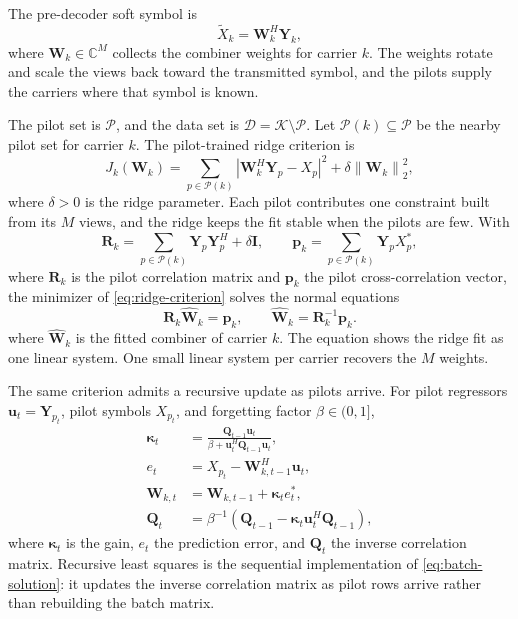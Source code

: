 \documentclass[conference]{IEEEtran}
\newcommand{\C}{\mathbb{C}}
\newcommand{\Kset}{\mathcal{K}}
\newcommand{\Pset}{\mathcal{P}}
\newcommand{\Dset}{\mathcal{D}}
\begin{document}
The pre-decoder soft symbol is
\begin{equation}
  \widetilde X_k=\mathbf W_k^{H}\mathbf Y_k,
  \label{eq:combiner}
\end{equation}
where \(\mathbf W_k\in\C^M\) collects the combiner weights for carrier
\(k\).
The weights rotate and scale the views back toward the transmitted symbol,
and the pilots supply the carriers where that symbol is known.

The pilot set is \(\Pset\), and the data set is
\(\Dset=\Kset\setminus\Pset\).  Let \(\Pset(k)\subseteq\Pset\) be the
nearby pilot set for carrier \(k\).  The pilot-trained ridge criterion is
\begin{equation}
  J_k(\mathbf W_k)
  =
  \sum_{p\in\Pset(k)}
  \left|\mathbf W_k^{H}\mathbf Y_p-X_p\right|^2
  +\delta\left\lVert\mathbf W_k\right\rVert_2^2,
  \label{eq:ridge-criterion}
\end{equation}
where \(\delta>0\) is the ridge parameter.  Each pilot contributes one
constraint built from its \(M\) views, and the ridge keeps the fit stable
when the pilots are few.  With
\begin{equation}
  \mathbf R_k=\sum_{p\in\Pset(k)}\mathbf Y_p\mathbf Y_p^{H}+\delta\mathbf I,
  \qquad
  \mathbf p_k=\sum_{p\in\Pset(k)}\mathbf Y_pX_p^{*},
  \label{eq:pilot-correlations}
\end{equation}
where \(\mathbf R_k\) is the pilot correlation matrix and
\(\mathbf p_k\) the pilot cross-correlation vector, the minimizer of
\eqref{eq:ridge-criterion} solves the normal equations
\begin{equation}
  \mathbf R_k\widehat{\mathbf W}_k=\mathbf p_k,
  \qquad
  \widehat{\mathbf W}_k=\mathbf R_k^{-1}\mathbf p_k.
  \label{eq:batch-solution}
\end{equation}
where \(\widehat{\mathbf W}_k\) is the fitted combiner of carrier \(k\).
The equation shows the ridge fit as one linear system.
One small linear system per carrier recovers the \(M\) weights.

The same criterion admits a recursive update as pilots arrive.  For pilot
regressors \(\mathbf u_t=\mathbf Y_{p_t}\), pilot symbols
\(X_{p_t}\), and forgetting factor \(\beta\in(0,1]\),
\begin{align}
  \boldsymbol\kappa_t
  &=
  \frac{\mathbf Q_{t-1}\mathbf u_t}
  {\beta+\mathbf u_t^{H}\mathbf Q_{t-1}\mathbf u_t},
  \label{eq:rls-gain}\\
  e_t
  &=
  X_{p_t}-\mathbf W_{k,t-1}^{H}\mathbf u_t,
  \label{eq:rls-error}\\
  \mathbf W_{k,t}
  &=
  \mathbf W_{k,t-1}+\boldsymbol\kappa_t e_t^{*},
  \label{eq:rls-update}\\
  \mathbf Q_t
  &=
  \beta^{-1}
  \left(\mathbf Q_{t-1}
  -\boldsymbol\kappa_t\mathbf u_t^{H}\mathbf Q_{t-1}\right),
  \label{eq:rls-inverse}
\end{align}
where \(\boldsymbol\kappa_t\) is the gain, \(e_t\) the prediction error, and
\(\mathbf Q_t\) the inverse correlation matrix.  Recursive least squares
is the sequential implementation of \eqref{eq:batch-solution}: it updates
the inverse correlation matrix as pilot rows arrive rather than rebuilding
the batch matrix.
\end{document}
